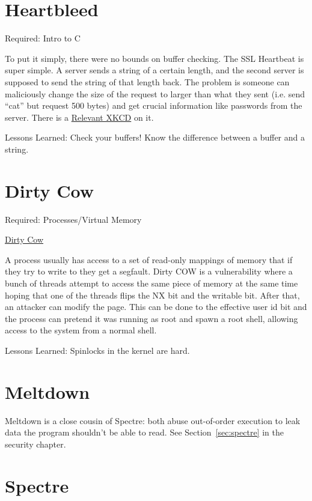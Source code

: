 \section{Heartbleed}
\label{pm:heartbleed}

Required: Intro to C

To put it simply, there were no bounds on buffer checking.
The SSL Heartbeat is super simple.
A server sends a string of a certain length, and the second server is supposed to send the string of that length back.
The problem is someone can maliciously change the size of the request to larger than what they sent (i.e. send ``cat'' but request 500 bytes) and get crucial information like passwords from the server.
There is a \href{https://xkcd.com/1354/}{Relevant XKCD} on it.

Lessons Learned: Check your buffers!
Know the difference between a buffer and a string.

\section{Dirty Cow}
\label{pm:dirtycow}

Required: Processes/Virtual Memory

\href{https://en.wikipedia.org/wiki/Dirty_COW}{Dirty Cow}

A process usually has access to a set of read-only mappings of memory that if they try to write to they get a segfault.
Dirty COW is a vulnerability where a bunch of threads attempt to access the same piece of memory at the same time hoping that one of the threads flips the NX bit and the writable bit.
After that, an attacker can modify the page.
This can be done to the effective user id bit and the process can pretend it was running as root and spawn a root shell, allowing access to the system from a normal shell.

Lessons Learned: Spinlocks in the kernel are hard.

\section{Meltdown}
\label{pm:meltdown}

Meltdown is a close cousin of Spectre: both abuse out-of-order execution to leak data the program shouldn't be able to read.
See Section~\ref{sec:spectre} in the security chapter.

\section{Spectre}
\label{pm:spectre}

